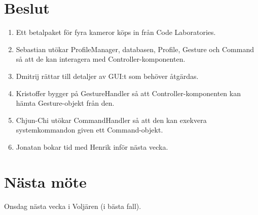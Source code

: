 \documentclass[a4paper,12pt]{article}
\begin{document}
\section{Beslut}
\begin{enumerate}
\item Ett betalpaket för fyra kameror köps in från Code Laboratories.
\item Sebastian utökar ProfileManager, databasen, Profile, Gesture och Command så att de kan
interagera med Controller-komponenten.
\item Dmitrij rättar till detaljer av GUI:t som behöver åtgärdas.
\item Kristoffer bygger på GestureHandler så att Controller-komponenten kan hämta
Gesture-objekt från den.
\item Chjun-Chi utökar CommandHandler så att den kan exekvera systemkommandon given ett
Command-objekt.
\item Jonatan bokar tid med Henrik inför nästa vecka.
\end{enumerate}

\section{Nästa möte}
Onsdag nästa vecka i Voljären (i bästa fall).
\end{document}
